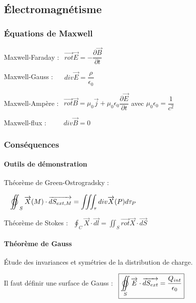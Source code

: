 \documentclass[9pt]{article}
\begin{document}
\begin{multicols*}{2}
\setlength{\columnseprule}{0.1pt}
\part*{Électromagnétisme}
\section{Équations de Maxwell}

Maxwell-Faraday : $\> \> \overrightarrow{rot}\overrightarrow{E} = -\dfrac{\partial \overrightarrow{B}}{\partial t}$ 

Maxwell-Gauss : $\> \> \> \> \> \> div\overrightarrow{E} = \dfrac{\rho}{\epsilon_{0}}$ 

Maxwell-Ampère : $  \> \>\overrightarrow{rot} \overrightarrow{B} = \mu_{0} \overrightarrow{j} + \mu_{0} \epsilon_{0} \dfrac{\partial \overrightarrow{E}}{\partial t} $ avec $\mu_{0}\epsilon_{0}=\dfrac{1}{c^{2}}$

Maxwell-flux : $\> \> \> \> \> \> \> \> \> \> div\overrightarrow{B} = 0$


\section{Conséquences}
\subsection{Outils de démonstration}

Théorème de Green-Ostrogradsky : 

$ \> \> \> \> \setbox0=\hbox{$\displaystyle \int\!\!\!\!\!\int$}
\setbox1=\hbox to \wd0{\hfill$\bigcirc$\hfill}
\setbox0=\hbox to \wd0{\copy0\hss\copy1}
\mathop{\copy0} _{S} \overrightarrow{X} (M) \cdot \overrightarrow{dS_{ext,M}} = \displaystyle{\iiint_\tau div \overrightarrow{X} (P) d\tau_{P}}
$

Théorème de Stokes : $\> \> \displaystyle{\oint_C \overrightarrow{X}\cdot\overrightarrow{dl}} = \displaystyle{\iint_S \overrightarrow{rot}\overrightarrow{X}\cdot\overrightarrow{dS}}$

\subsection{Théorème de Gauss}

Étude des invariances et symétries de la distribution de charge.

Il faut définir une surface de Gauss : $\> \> \boxed{\setbox0=\hbox{$\displaystyle \int\!\!\!\!\!\int$}
\setbox1=\hbox to \wd0{\hfill$\bigcirc$\hfill}
\setbox0=\hbox to \wd0{\copy0\hss\copy1}
\mathop{\copy0} _{S} \overrightarrow{E}\cdot\overrightarrow{dS_{ext}} = \dfrac{Q_{int}}{\epsilon_{0}}}$


\end{multicols*}
\end{document}
